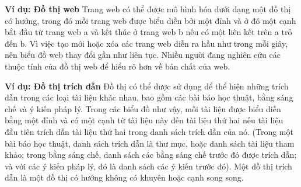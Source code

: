 \textbf{Ví dụ: Đồ thị web}
Trang web có thể được mô hình hóa dưới dạng một đồ thị có hướng, trong đó mỗi trang web được biểu diễn bởi một đỉnh và ở đó một cạnh bắt đầu từ trang web a và kết thúc ở trang web b nếu có một liên kết trên a trỏ đến b. Vì việc tạo mới hoặc xóa các trang web diễn ra hầu như trong mỗi giây, nên biểu đồ web thay đổi gần như liên tục. Nhiều người đang nghiên cứu các thuộc tính của đồ thị web để hiểu rõ hơn về bản chất của web.

\textbf{Ví dụ: Đồ thị trích dẫn}
Đồ thị có thể được sử dụng để thể hiện những trích dẫn trong các loại tài liệu khác nhau, bao gồm các bài báo học thuật, bằng sáng chế và ý kiến pháp lý. Trong các biểu đồ như vậy, mỗi tài liệu được biểu diễn bằng một đỉnh và có một cạnh từ tài liệu này đến tài liệu thứ hai nếu tài liệu đầu tiên trích dẫn tài liệu thứ hai trong danh sách trích dẫn của nó. (Trong một bài báo học thuật, danh sách trích dẫn là thư mục, hoặc danh sách tài liệu tham khảo; trong bằng sáng chế, danh sách các bằng sáng chế trước đó được trích dẫn; và với các ý kiến pháp lý, đó là danh sách các ý kiến trước đó). Một đồ thị trích dẫn là một đồ thị có hướng không có khuyên hoặc cạnh song song.




